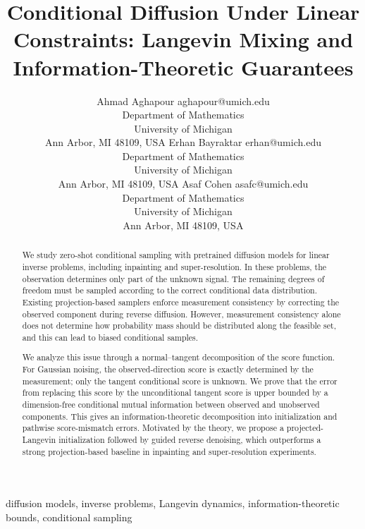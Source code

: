 \documentclass[twoside,11pt]{article}
\numberwithin{equation}{section}
\begin{document}
\title{Conditional Diffusion Under Linear Constraints: Langevin Mixing and Information-Theoretic Guarantees}

\author{
\name Ahmad Aghapour \email aghapour@umich.edu \\
\addr Department of Mathematics \\
University of Michigan \\
Ann Arbor, MI 48109, USA
\AND
\name Erhan Bayraktar \email erhan@umich.edu \\
\addr Department of Mathematics \\
University of Michigan \\
Ann Arbor, MI 48109, USA
\AND
\name Asaf Cohen \email asafc@umich.edu \\
\addr Department of Mathematics \\
University of Michigan \\
Ann Arbor, MI 48109, USA
}

\editor{}
\maketitle

\begin{abstract}%
We study zero-shot conditional sampling with pretrained diffusion models for linear inverse problems, including inpainting and super-resolution. In these problems, the observation determines only part of the unknown signal. The remaining degrees of freedom must be sampled according to the correct conditional data distribution. Existing projection-based samplers enforce measurement consistency by correcting the observed component during reverse diffusion. However, measurement consistency alone does not determine how probability mass should be distributed along the feasible set, and this can lead to biased conditional samples.

We analyze this issue through a normal--tangent decomposition of the score function. For Gaussian noising, the observed-direction score is exactly determined by the measurement; only the tangent conditional score is unknown. We prove that the error from replacing this score by the unconditional tangent score is upper bounded by a dimension-free conditional mutual information between observed and unobserved components. This gives an information-theoretic decomposition into initialization and pathwise score-mismatch errors. Motivated by the theory, we propose a projected-Langevin initialization followed by guided reverse denoising, which outperforms a strong projection-based baseline in inpainting and super-resolution experiments.
\end{abstract}
\begin{keywords}
diffusion models, inverse problems, Langevin dynamics, information-theoretic bounds, conditional sampling 
\end{keywords}
\end{document}
